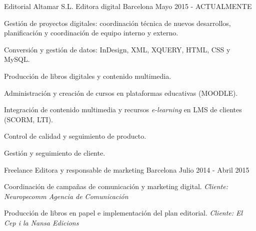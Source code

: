 

\begin{cventries}

  \cventry
    {Editorial Altamar S.L.} %
    {Editora digital} %
    {Barcelona} %
    {Mayo 2015 - ACTUALMENTE} %
    {
      \begin{cvitems} %
        \item {Gestión de proyectos digitales: coordinación técnica de nuevos desarrollos, planificación y coordinación de equipo interno y externo.}
        \item {Conversión y gestión de datos: InDesign, XML, XQUERY, HTML, CSS y MySQL. }
        \item {Producción de libros digitales y contenido multimedia.}
        \item {Administración y creación de cursos en plataformas educativas (MOODLE).}
        \item {Integración de contenido multimedia y recursos \textit{e-learning} en LMS de clientes (SCORM, LTI).}
        \item {Control de calidad y seguimiento de producto.}
        \item {Gestión y seguimiento de cliente.}
      \end{cvitems}
    }

  \cventry
    {Freelance} %
    {Editora y responsable de marketing} %
    {Barcelona} %
    {Julio 2014 - Abril 2015} %
    {
      \begin{cvitems} %
        \item {Coordinación de campañas de comunicación y marketing digital. \textit{Cliente: Neuropecomm Agencia de Comunicación} }
        \item {Producción de libros en papel e implementación del plan editorial. \textit{Cliente: El Cep i la Nansa Edicions}}
      \end{cvitems}
    }


\end{cventries}
